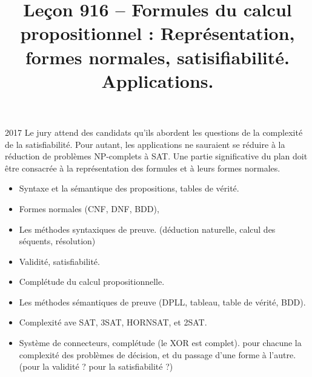 \documentclass{agregfiche}
\title{Leçon 916 -- Formules du calcul propositionnel : Représentation, formes
normales, satisifiabilité. Applications.}
\begin{document}
\maketitle

\secrapports

\begin{rapport}{2017}
    Le jury attend des candidats qu'ils abordent les questions de la complexité de la satisfiabilité. Pour autant, les applications ne sauraient se réduire à la réduction de problèmes NP-complets à SAT. Une partie significative du plan doit être consacrée à la représentation des formules et à leurs formes normales.
\end{rapport}

\secindispensables

\begin{itemize}
    \item Syntaxe et la sémantique des propositions, tables de vérité.
   	\item Formes normales (CNF, DNF, BDD),
    \item Les méthodes syntaxiques de preuve. (déduction naturelle,
calcul des séquents, résolution)
    \item Validité, satisfiabilité.

\end{itemize}

\secasavoir

\begin{itemize}
    \item Complétude du calcul propositionnelle.
    \item Les méthodes sémantiques de preuve (DPLL, tableau, 
table de vérité, BDD).
	\item Complexité ave SAT, 3SAT, HORNSAT, et 2SAT.
	\item Système de connecteurs, complétude (le XOR est complet).
	pour chacune la complexité des problèmes de décision, 
	et du passage d'une forme à l'autre. (pour la validité ? pour la
	satisfiabilité ?)
\end{itemize}


\secidees
\end{document}
